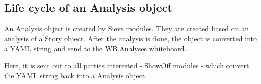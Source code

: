 \subsection{Life cycle of an Analysis object}

An Analysis object is created by Sieve modules. They are created based on an
analysis of a Story object. After the analysis is done, the object is converted
into a \ac{YAML} string and send to the WB.Analyses whiteboard.

Here, it is sent out to all parties interested - ShowOff modules - which
convert the YAML string back into a Analysis object.
